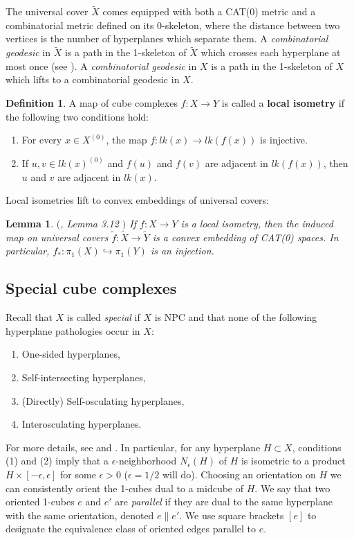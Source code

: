 \documentclass[11pt]{amsart}
\numberwithin{thm}{section}
\newtheorem{lemma}[thm]{Lemma}
\theoremstyle{remark}
\theoremstyle{definition}
\newtheorem{definition}[thm]{Definition}
\newcommand{\til}{\widetilde}
\begin{document}
The universal cover $\widetilde{X}$ comes equipped with both a CAT(0) metric and a combinatorial metric defined on its 0-skeleton, where the distance between two vertices is the number of hyperplanes which separate them.  A \emph{combinatorial geodesic} in $\widetilde{X}$ is a path in the 1-skeleton of $\widetilde{X}$ which crosses each hyperplane at most once (see \cite{Wise12}).  A \emph{combinatorial geodesic} in $X$ is a path in the 1-skeleton of $X$ which lifts to a combinatorial geodesic in $X$.

\begin{definition}A map of cube complexes $f:X\rightarrow Y$ is called a \textbf{local isometry} if the following two conditions hold:
\begin{enumerate}
\item For every $x\in X^{(0)}$, the map $f:lk(x)\rightarrow lk(f(x))$ is injective.
\item If $u,v\in lk(x)^{(0)}$ and $f(u)$ and $f(v)$ are adjacent in $lk(f(x))$, then $u$ and $v$ are adjacent in $lk(x)$.
\end{enumerate}
\end{definition}
\noindent
Local isometries lift to convex embeddings of universal covers: 
\begin{lemma}\label{localIsom}$($\cite{Wise12}, Lemma 3.12 $ )$ If $f:X\rightarrow Y$ is a local isometry, then the induced map on universal covers $\til{f}:\til{X}\rightarrow \til{Y}$ is a convex embedding of CAT(0) spaces.  In particular, $f_*:\pi_1(X)\hookrightarrow \pi_1(Y)$ is an injection. 
\end{lemma}

%
\subsection{Special cube complexes}
Recall that $X$ is called \emph{special} if $X$ is NPC and that none of the following hyperplane pathologies occur in $X$:
\begin{enumerate}
\item One-sided hyperplanes,
\item Self-intersecting hyperplanes,
\item (Directly) Self-osculating hyperplanes,
\item Interosculating hyperplanes.

\end{enumerate}
For more details, see \cite{HaWi08} and \cite{Wise12}.  In particular, for any hyperplane $H\subset X$, conditions (1) and (2) imply that a $\epsilon$-neighborhood $N_\epsilon(H)$ of $H$ is isometric to a product $H\times[-\epsilon,\epsilon]$ for some $\epsilon>0$ ($\epsilon=1/2$ will do). Choosing an orientation on $H$ we can consistently orient the 1-cubes dual to a midcube of $H$.  We say that two oriented 1-cubes $e$ and $e'$ are \emph{parallel} if they are dual to the same hyperplane with the same orientation, denoted $e\|e'$.  We use square brackets $[e]$ to designate the equivalence class of oriented edges parallel to $e$.  
\end{document}
